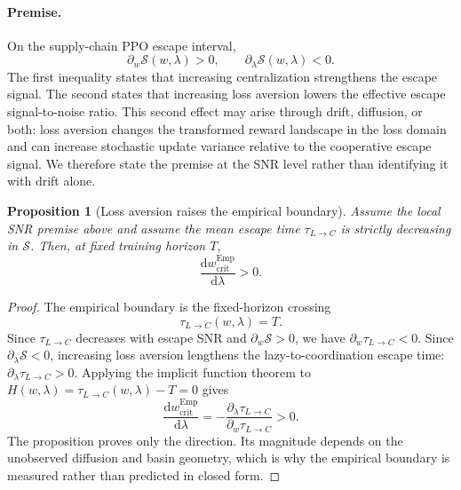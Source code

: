 \documentclass[letterpaper]{article} %
\theoremstyle{plain}
\newtheorem{proposition}{Proposition}
\newcommand{\wcrit}{w_{\mathrm{crit}}}
\begin{document}
\paragraph{Premise.}
On the supply-chain PPO escape interval,
\begin{equation}
 \partial_w \mathcal{S}(w,\lambda)>0,\qquad
 \partial_\lambda \mathcal{S}(w,\lambda)<0.
\end{equation}
The first inequality states that increasing centralization strengthens the escape signal. The
second states that increasing loss aversion lowers the effective escape signal-to-noise ratio. This
second effect may arise through drift, diffusion, or both: loss aversion changes the transformed
reward landscape in the loss domain and can increase stochastic update variance relative to the
cooperative escape signal. We therefore state the premise at the SNR level rather than identifying
it with drift alone.

\begin{proposition}[Loss aversion raises the empirical boundary]\label{thm:sign}
Assume the local SNR premise above and assume the mean escape time $\tau_{L\to C}$ is strictly
decreasing in $\mathcal{S}$. Then, at fixed training horizon $T$,
\begin{equation}
 \frac{\mathrm{d}\wcrit^{\mathrm{Emp}}}{\mathrm{d}\lambda}>0 .
\end{equation}
\end{proposition}
\begin{proof}
The empirical boundary is the fixed-horizon crossing
\begin{equation}
 \tau_{L\to C}(w,\lambda)=T .
\end{equation}
Since $\tau_{L\to C}$ decreases with escape SNR and $\partial_w\mathcal{S}>0$, we have
$\partial_w \tau_{L\to C}<0$. Since $\partial_\lambda\mathcal{S}<0$, increasing loss aversion
lengthens the lazy-to-coordination escape time: $\partial_\lambda \tau_{L\to C}>0$. Applying the
implicit function theorem to $H(w,\lambda)=\tau_{L\to C}(w,\lambda)-T=0$ gives
\begin{equation}
 \frac{\mathrm{d}\wcrit^{\mathrm{Emp}}}{\mathrm{d}\lambda}
 =
 -\frac{\partial_\lambda \tau_{L\to C}}
 {\partial_w \tau_{L\to C}}
 >0 .
\end{equation}
The proposition proves only the direction. Its magnitude depends on the unobserved diffusion and
basin geometry, which is why the empirical boundary is measured rather than predicted in closed
form.
\end{proof}
\end{document}
